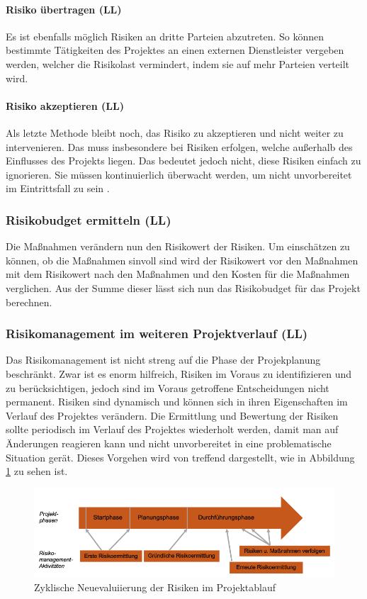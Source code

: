 \documentclass[ThesisDJ.tex]{subfiles}
\begin{document}
\paragraph{Risiko übertragen (LL)}
Es ist ebenfalls möglich Risiken an dritte Parteien abzutreten. So können bestimmte Tätigkeiten des Projektes an einen externen Dienstleister vergeben werden, welcher die Risikolast vermindert, indem sie auf mehr Parteien verteilt wird. 

\paragraph{Risiko akzeptieren (LL)}
Als letzte Methode bleibt noch, das Risiko zu akzeptieren und nicht weiter zu intervenieren. Das muss insbesondere bei Risiken erfolgen, welche außerhalb des Einflusses des Projekts liegen. Das bedeutet jedoch nicht, diese Risiken einfach zu ignorieren. Sie müssen kontinuierlich überwacht werden, um nicht unvorbereitet im Eintrittsfall zu sein \cite{cicek2022risikomanagement}.

\subsubsection{Risikobudget ermitteln (LL)}
Die Maßnahmen verändern nun den Risikowert der Risiken. Um einschätzen zu können, ob die Maßnahmen sinvoll sind wird der Risikowert vor den Maßnahmen mit dem Risikowert nach den Maßnahmen und den Kosten für die Maßnahmen verglichen. Aus der Summe dieser lässt sich nun das Risikobudget für das Projekt berechnen.

\subsubsection{Risikomanagement im weiteren Projektverlauf (LL)}
Das Risikomanagement ist nicht streng auf die Phase der Projekplanung beschränkt. Zwar ist es enorm hilfreich, Risiken im Voraus zu identifizieren und zu berücksichtigen, jedoch sind im Voraus getroffene Entscheidungen nicht permanent. Risiken sind dynamisch und können sich in ihren Eigenschaften im Verlauf des Projektes verändern. Die Ermittlung und Bewertung der Risiken sollte periodisch im Verlauf des Projektes wiederholt werden, damit man auf Änderungen reagieren kann und nicht unvorbereitet in eine problematische Situation gerät. Dieses Vorgehen wird von \cite[S.~27]{cicek2022risikomanagement} treffend dargestellt, wie in Abbildung \ref{fig:riskcycle} zu sehen ist.

\begin{figure}
    \centering
    \includegraphics[width=\linewidth]{riskcycle.png}
    \caption{Zyklische Neuevaluiierung der Risiken im Projektablauf}
    \label{fig:riskcycle}
\end{figure}
\end{document}
